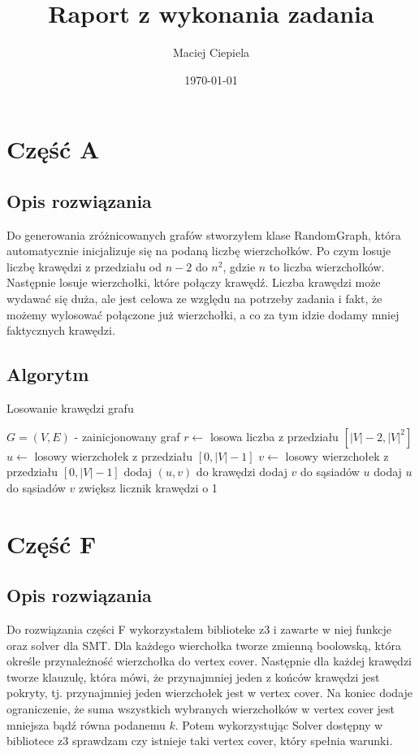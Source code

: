 \documentclass{article}
\title{Raport z wykonania zadania}
\author{Maciej Ciepiela}
\date{\today}
\begin{document}
\maketitle

\vspace{2cm}
\section{Część A}
\subsection{Opis rozwiązania}

Do generowania zróżnicowanych grafów stworzyłem klase RandomGraph,
która automatycznie inicjalizuje się na podaną liczbę wierzchołków.
Po czym losuje liczbę krawędzi z przedziału od $n-2$ do $n^2$, gdzie $n$ to liczba wierzchołków.
Następnie losuje wierzchołki, które połączy krawędź. 
Liczba krawędzi może wydawać się duża, ale jest celowa ze względu na potrzeby zadania i fakt, 
że możemy wylosować połączone już wierzchołki, a co za tym idzie dodamy mniej faktycznych krawędzi.

\subsection{Algorytm}
\begin{algorithm}
\caption{Losowanie krawędzi grafu}
\begin{algorithmic}[1]
  \scriptsize 
\STATE $G = (V, E)$ - zainicjonowany graf
\STATE $r \leftarrow$ losowa liczba z przedziału $[|V| - 2, |V|^2]$
    \STATE $u \leftarrow$ losowy wierzchołek z przedziału $[0, |V| - 1]$
    \STATE $v \leftarrow$ losowy wierzchołek z przedziału $[0, |V| - 1]$
        \STATE dodaj $(u, v)$ do krawędzi
        \STATE dodaj $v$ do sąsiadów $u$
        \STATE dodaj $u$ do sąsiadów $v$
        \STATE zwiększ licznik krawędzi o 1
    \ENDIF
\ENDFOR
\end{algorithmic}
\end{algorithm}
\vspace{2cm}

\section{Część F}
\subsection{Opis rozwiązania}
Do rozwiązania części F wykorzystałem biblioteke z3 i zawarte w niej funkcje oraz solver dla SMT.
Dla każdego wierchołka tworze zmienną boolowską, która określe przynależność wierzchołka do vertex cover.
Następnie dla każdej krawędzi tworze klauzulę, która mówi, że przynajmniej jeden z końców krawędzi jest pokryty, 
tj. przynajmniej jeden wierzchołek jest w vertex cover. Na koniec dodaje ograniczenie, że suma wszystkich 
wybranych wierzchołków w vertex cover jest mniejsza bądź równa podanemu $k$. 
Potem wykorzystując Solver dostępny w bibliotece z3 sprawdzam czy istnieje taki vertex cover, który spełnia warunki.
\end{document}
